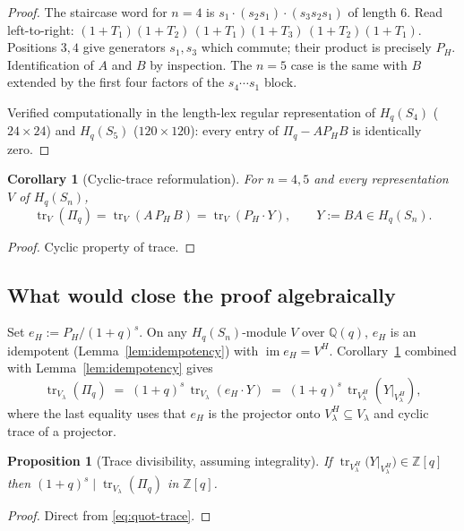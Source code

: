 \documentclass[11pt]{article}
\newtheorem{proposition}[theorem]{Proposition}
\newtheorem{corollary}[theorem]{Corollary}
\theoremstyle{definition}
\newcommand{\Pq}{\Pi_q}
\newcommand{\PH}{P_H}
\newcommand{\Hq}{H_q(S_n)}
\newcommand{\Z}{\mathbb{Z}}
\newcommand{\Q}{\mathbb{Q}}
\newcommand{\tr}{\operatorname{tr}}
\begin{document}
\begin{proof}
The staircase word for $n=4$ is $s_1\cdot(s_2s_1)\cdot(s_3s_2s_1)$ of
length $6$. Read left-to-right:
$(1+T_1)(1+T_2)\,(1+T_1)(1+T_3)\,(1+T_2)(1+T_1)$. Positions $3,4$ give
generators $s_1,s_3$ which commute; their product is precisely $\PH$.
Identification of $A$ and $B$ by inspection. The $n=5$ case is the same
with $B$ extended by the first four factors of the $s_4\cdots s_1$ block.

Verified computationally in the length-lex regular representation of
$H_q(S_4)$ ($24\times 24$) and $H_q(S_5)$ ($120\times 120$): every entry
of $\Pq-A\PH B$ is identically zero.
\end{proof}

\begin{corollary}[Cyclic-trace reformulation]\label{cor:cyclic}
For $n=4,5$ and every representation $V$ of $\Hq$,
\[
  \tr_V(\Pq) = \tr_V(A\,\PH\,B) = \tr_V(\PH\cdot Y),\qquad Y:=BA\in\Hq.
\]
\end{corollary}

\begin{proof}
Cyclic property of trace.
\end{proof}

\subsection{What would close the proof algebraically}

Set $e_H:=\PH/(1+q)^s$. On any $\Hq$-module $V$ over $\Q(q)$,
$e_H$ is an idempotent (Lemma~\ref{lem:idempotency}) with
$\operatorname{im}e_H=V^H$. Corollary~\ref{cor:cyclic} combined with
Lemma~\ref{lem:idempotency} gives
\begin{equation}\label{eq:quot-trace}
  \tr_{V_\lambda}(\Pq)
  \;=\;(1+q)^s\,\tr_{V_\lambda}(e_H\cdot Y)
  \;=\;(1+q)^s\,\tr_{V_\lambda^H}(Y|_{V_\lambda^H}),
\end{equation}
where the last equality uses that $e_H$ is the projector onto
$V_\lambda^H\subseteq V_\lambda$ and cyclic trace of a projector.

\begin{proposition}[Trace divisibility, assuming integrality]\label{prop:conditional}
If $\tr_{V_\lambda^H}\bigl(Y|_{V_\lambda^H}\bigr)\in\Z[q]$ then
$(1+q)^s\mid\tr_{V_\lambda}(\Pq)$ in $\Z[q]$.
\end{proposition}

\begin{proof}
Direct from \eqref{eq:quot-trace}.
\end{proof}
\end{document}
